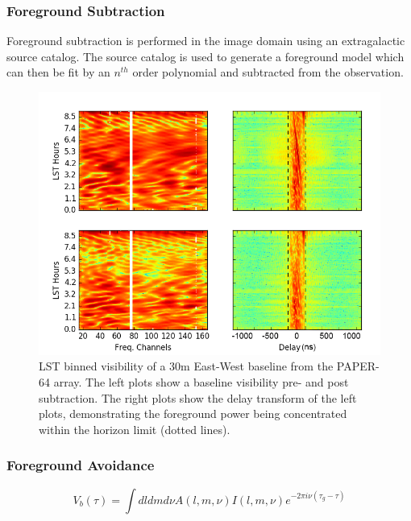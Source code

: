 \documentclass[a0,landscape]{a0poster}
\begin{document}
\begin{multicols}{4}
\subsubsection*{Foreground Subtraction}
Foreground subtraction is performed in the image domain using an extragalactic source catalog. The source catalog is used to generate a foreground model which can then be fit by an $n^{th}$ order polynomial and subtracted from the observation.
\begin{figure}[H]
\centering
\includegraphics[width=0.6\linewidth]{figures/foresub.png}
\caption{LST binned visibility of a 30m East-West baseline from the PAPER-64 array. The left plots show a baseline visibility pre- and post subtraction. The right plots show the delay transform of the left plots, demonstrating the foreground power being concentrated within the horizon limit (dotted lines).}
\label{foregroundsrcs1}
\end{figure}


\subsubsection*{Foreground Avoidance}
\begin{equation}
\label{delaytransform}
V_b(\tau) = \int dl dm d\nu A(l,m,\nu)I(l,m,\nu)e^{-2\pi i\nu(\tau_g -\tau)}
\end{equation}


\end{multicols}
\end{document}
